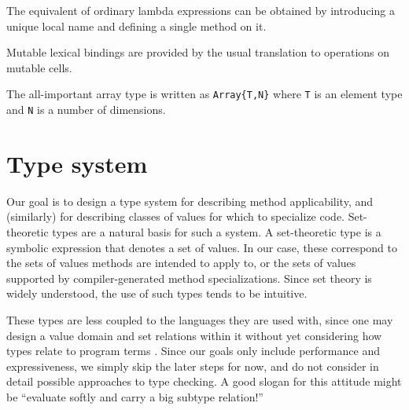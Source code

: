
The equivalent of ordinary lambda expressions can be obtained by introducing
a unique local name and defining a single method on it.

Mutable lexical bindings are provided by the usual translation to operations
on mutable cells.

The all-important array type is written as \texttt{Array\{T,N\}} where
\texttt{T} is an element type and \texttt{N} is a number of dimensions.





\section{Type system}

Our goal is to design a type system for describing method applicability,
and (similarly) for describing classes of values for which to specialize code.
Set-theoretic types are a natural basis for such a system.
A set-theoretic type is a symbolic expression that denotes a set of values.
In our case, these correspond to the sets of values methods are intended to apply
to, or the sets of values supported by compiler-generated method specializations.
Since set theory is widely understood, the use of such types tends to be intuitive.

These types
are less coupled to the languages they are used with, since one may design
a value domain and set relations within it without yet considering how types
relate to program terms \cite{1029823} \cite{Castagna:2005:GIS:1069774.1069793}.
Since our goals only include
performance and expressiveness, we simply skip the later steps for now, and do
not consider in detail possible approaches to type checking.
A good slogan for this attitude might be ``evaluate softly and carry a big
subtype relation!''

